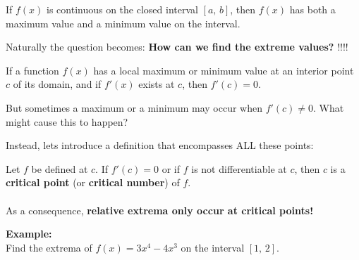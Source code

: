 \documentclass[addpoints, 12pt]{exam}
\begin{document}
\begin{tcolorbox}[title= THE EXTREME VALUE THEOREM,black,sharp corners,colback=white,colbacktitle=white,coltitle=black,boxrule=1pt]

    If $f(x)$ is continuous on the closed interval $[a,\,b]$, then $f(x)$ has both a maximum value and a minimum value on the interval.
    
\end{tcolorbox}
\vspace{1cm}
Naturally the question becomes: \textbf{How can we find the extreme values?} \underline{\hspace{3cm}}!!!!


\newpage


\begin{tcolorbox}[title= DEFINITION OF LOCAL EXTREME VALUES,black,sharp corners,colback=white,colbacktitle=white,coltitle=black,boxrule=1pt]

    If a function $f(x)$ has a local maximum or minimum value at an interior point $c$ of its domain, and if $f'(x)$ exists at $c$, then $f'(c)=0$. 
    
\end{tcolorbox}
\vspace{1cm}
But sometimes a maximum or a minimum may occur when $f'(c)\ne0$. What might cause this to happen?
\begin{center}
    \underline{\hspace{6cm}}
\end{center}
\vspace{2cm}

Instead, lets introduce a definition that encompasses ALL these points:\\

\begin{tcolorbox}[title= DEFINITION OF A CRITICAL POINT,black,sharp corners,colback=white,colbacktitle=white,coltitle=black,boxrule=1pt]

    Let $f$ be defined at $c$. If $f'(c)=0$ or if $f$ is not differentiable at $c$, then $c$ is a \textbf{critical point} (or \textbf{critical number}) of $f$.\\
    \\
    As a consequence, \textbf{relative extrema only occur at critical points!}
    
\end{tcolorbox}
\vspace{.15cm}
\noindent\textbf{Example:}\\
Find the extrema of $f(x)=3x^4-4x^3$ on the interval $[1,\,2]$.
\end{document}
